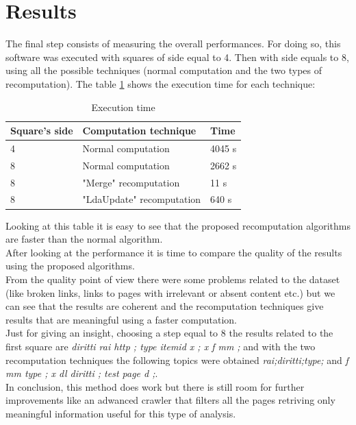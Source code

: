 \documentclass{sig-alternate-05-2015}
\begin{document}
\section{Results}\label{results}
The final step consists of measuring the overall performances.\newline
For doing so, this software was executed with squares of side equal to 4. Then with side equals to 8, using all the possible techniques (normal computation and the two types of recomputation). The table \ref{exectime} shows the execution time for each technique:\\
\begin{table}[h]
\centering
\caption{Execution time}
\label{exectime}
\begin{tabular}{@{}|l|l|l|@{}}
\toprule
Square's side & Computation technique  & Time   \\ \midrule
4             & Normal computation     & 4045 s \\ \midrule
8             & Normal computation     & 2662 s \\ \midrule
8             & "Merge" recomputation  & 11 s   \\ \midrule
8             & "LdaUpdate" recomputation & 640 s  \\ \bottomrule
\end{tabular}
\end{table}
Looking at this table it is easy to see that the proposed recomputation algorithms are faster than the normal algorithm.\\
After looking at the performance it is time to compare the quality of the results using the proposed algorithms.\\
From the quality point of view there were some problems related to the dataset (like broken links, links to pages with irrelevant or absent content etc.) but we can see that the results are coherent and the recomputation techniques give results that are meaningful using a faster computation. \\ Just for giving an insight, choosing a step equal to 8 the results related to the first square are \emph{diritti  rai  http ; type  itemid  x ; x  f  mm ;} and with the two recomputation techniques the following topics were obtained \emph{rai;diritti;type;} and \emph{f  mm  type ; x  dl  diritti ; test  page  d ;}.\\
In conclusion, this method does work but there is still room for further improvements like an adwanced crawler that filters all the pages retriving only meaningful information useful for this type of analysis.
\end{document}
